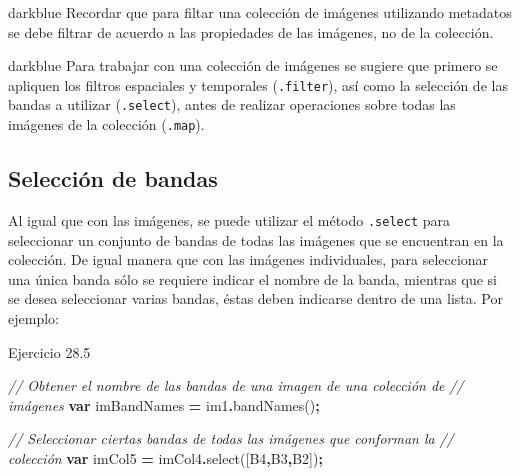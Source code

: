 \documentclass[
  12pt,
  letterpaper,
  twoside]{book}
\newenvironment{Shaded}{\begin{snugshade}}{\end{snugshade}}
\newcommand{\CommentTok}[1]{\textcolor[rgb]{0.56,0.35,0.01}{\textit{#1}}}
\newcommand{\FunctionTok}[1]{\textcolor[rgb]{0.00,0.00,0.00}{#1}}
\newcommand{\KeywordTok}[1]{\textcolor[rgb]{0.13,0.29,0.53}{\textbf{#1}}}
\newcommand{\NormalTok}[1]{#1}
\newcommand{\OperatorTok}[1]{\textcolor[rgb]{0.81,0.36,0.00}{\textbf{#1}}}
\newcommand{\StringTok}[1]{\textcolor[rgb]{0.31,0.60,0.02}{#1}}
\begin{document}
\begin{bluebox2}

\begin{awesomeblock}{5pt}{\faLightbulb}{darkblue}
Recordar que para filtar una colección de imágenes utilizando metadatos se debe filtrar de acuerdo a las propiedades de las imágenes, no de la colección.

\end{awesomeblock}

\end{bluebox2}

\begin{bluebox2}

\begin{awesomeblock}{5pt}{\faLightbulb}{darkblue}
Para trabajar con una colección de imágenes se sugiere que primero se apliquen los filtros espaciales y temporales (\texttt{.filter}), así como la selección de las bandas a utilizar (\texttt{.select}), antes de realizar operaciones sobre todas las imágenes de la colección (\texttt{.map}).

\end{awesomeblock}

\end{bluebox2}

\hypertarget{selecciuxf3n-de-bandas-1}{%
\subsection{Selección de bandas}\label{selecciuxf3n-de-bandas-1}}

Al igual que con las imágenes, se puede utilizar el método \texttt{.select} para seleccionar un conjunto de bandas de todas las imágenes que se encuentran en la colección. De igual manera que con las imágenes individuales, para seleccionar una única banda sólo se requiere indicar el nombre de la banda, mientras que si se desea seleccionar varias bandas, éstas deben indicarse dentro de una lista. Por ejemplo:

Ejercicio 28.5

\begin{Shaded}
\begin{Highlighting}[]
\CommentTok{// Obtener el nombre de las bandas de una imagen de una colección de }
\CommentTok{// imágenes}
\KeywordTok{var}\NormalTok{ imBandNames }\OperatorTok{=}\NormalTok{ im1}\OperatorTok{.}\FunctionTok{bandNames}\NormalTok{()}\OperatorTok{;}

\CommentTok{// Seleccionar ciertas bandas de todas las imágenes que conforman la }
\CommentTok{// colección}
\KeywordTok{var}\NormalTok{ imCol5 }\OperatorTok{=}\NormalTok{ imCol4}\OperatorTok{.}\FunctionTok{select}\NormalTok{([}\StringTok{\textquotesingle{}B4\textquotesingle{}}\OperatorTok{,}\StringTok{\textquotesingle{}B3\textquotesingle{}}\OperatorTok{,}\StringTok{\textquotesingle{}B2\textquotesingle{}}\NormalTok{])}\OperatorTok{;}
\end{Highlighting}
\end{Shaded}
\end{document}
